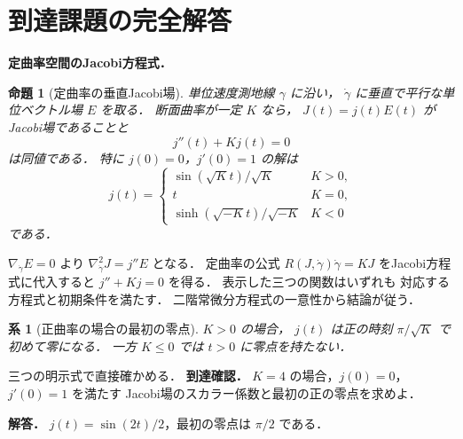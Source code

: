 \documentclass[a5paper,10pt,onecolumn]{jsarticle}
\makeatletter
\theoremstyle{mathnotetheorem}
\newtheorem{proposition}[theorem]{命題}
\newtheorem{corollary}[theorem]{系}
\renewcommand{\proofname}{証明}
\renewenvironment{proof}[1][\proofname]{%
  \par\pushQED{\qed}\normalfont\topsep4\p@\@plus2\p@\relax
  \trivlist\item[\hskip\labelsep\bfseries #1]\ignorespaces
}{\popQED\endtrivlist\@endpefalse}
\makeatother
\begin{document}
\section{到達課題の完全解答}
\noindent\textbf{定曲率空間のJacobi方程式．}
\begin{proposition}[定曲率の垂直Jacobi場]
単位速度測地線 $\gamma$ に沿い，
$\dot\gamma$ に垂直で平行な単位ベクトル場 $E$ を取る．
断面曲率が一定 $K$ なら，
$J(t)=j(t)E(t)$ がJacobi場であることと
\[
j''(t)+Kj(t)=0
\]
は同値である．
特に $j(0)=0$，$j'(0)=1$ の解は
\[
j(t)=
\begin{cases}
\sin(\sqrt Kt)/\sqrt K&K>0,\\
t&K=0,\\
\sinh(\sqrt{-K}t)/\sqrt{-K}&K<0
\end{cases}
\]
である．
\end{proposition}
\begin{proof}
$\nabla_{\dot\gamma}E=0$ より
$\nabla_{\dot\gamma}^2J=j''E$ となる．
定曲率の公式
$R(J,\dot\gamma)\dot\gamma=KJ$
をJacobi方程式に代入すると
$j''+Kj=0$ を得る．
表示した三つの関数はいずれも
対応する方程式と初期条件を満たす．
二階常微分方程式の一意性から結論が従う．
\end{proof}
\begin{corollary}[正曲率の場合の最初の零点]
$K>0$ の場合，
$j(t)$ は正の時刻 $\pi/\sqrt K$ で初めて零になる．
一方 $K\le0$ では $t>0$ に零点を持たない．
\end{corollary}
\begin{proof}
三つの明示式で直接確かめる．
\end{proof}
\noindent\textbf{到達確認．}
$K=4$ の場合，$j(0)=0$，$j'(0)=1$ を満たす
Jacobi場のスカラー係数と最初の正の零点を求めよ．
\par\noindent\textbf{解答．}
$j(t)=\sin(2t)/2$，最初の零点は $\pi/2$ である．
\end{document}
